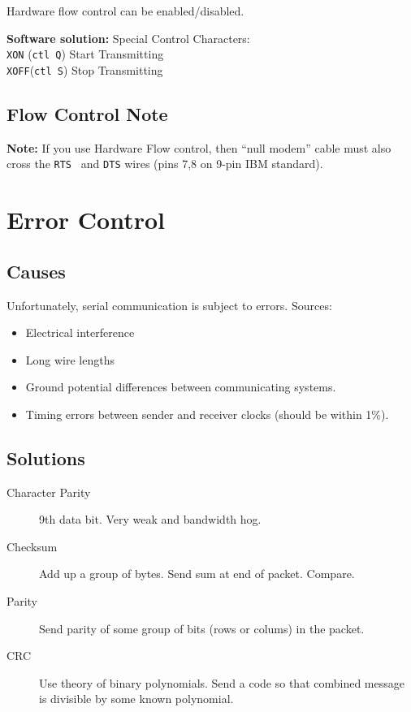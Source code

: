 Hardware flow control can be enabled/disabled.

{\bf Software solution:} Special Control Characters:\\
{\tt XON} ({\tt ctl Q}) Start Transmitting\\
{\tt XOFF}({\tt ctl S}) Stop Transmitting



\subsection{Flow Control Note}

{\bf Note:}  If you use Hardware Flow control,
then ``null modem'' cable must also cross the
{\tt RTS } and {\tt DTS} wires (pins 7,8 on 9-pin
IBM standard).



\section{Error Control}
\subsection{Causes}
Unfortunately, serial communication is subject
to errors.  Sources:

\begin{itemize}
        \item Electrical interference
        \item Long wire lengths
        \item Ground potential differences between
        communicating systems.
        \item Timing errors between sender and
        receiver clocks (should be within 1\%).
\end{itemize}


\subsection{Solutions}
\begin{description}
 \item[Character Parity] 9th data bit.
        Very weak and bandwidth hog.
 \item[Checksum]  Add up a group of bytes.
        Send sum at end of packet. Compare.
 \item[Parity] Send parity of some group of
        bits (rows or colums) in the packet.
 \item[CRC] Use theory of binary polynomials.
       Send a code so that combined message
       is divisible by some known polynomial.
\end{description}

